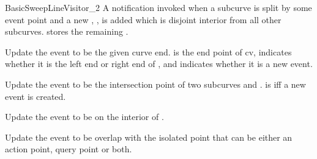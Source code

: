 \begin{ccRefConcept}{BasicSweepLineVisitor_2}
    {A notification invoked when a subcurve  is split by some event point and a
     new , , is added which is disjoint interior from all other subcurves.
      stores the remaining . }
\ccGlue




    {Update the event to be the given curve end.  is the end point of {cv}, 
      indicates whether it is the left end or right end of , and  indicates whether it
      is a new event.}
\ccGlue

    { Update the event to be the intersection point of two subcurves  and . is  iff a new
      event is created.}
\ccGlue

    {Update the event to be on the interior of .}
    
    {Update the event to be overlap with the isolated point  that can be either an action point, query point or both.}
    
  
\ccHasModels

\end{ccRefConcept}

\ccRefPageEnd
